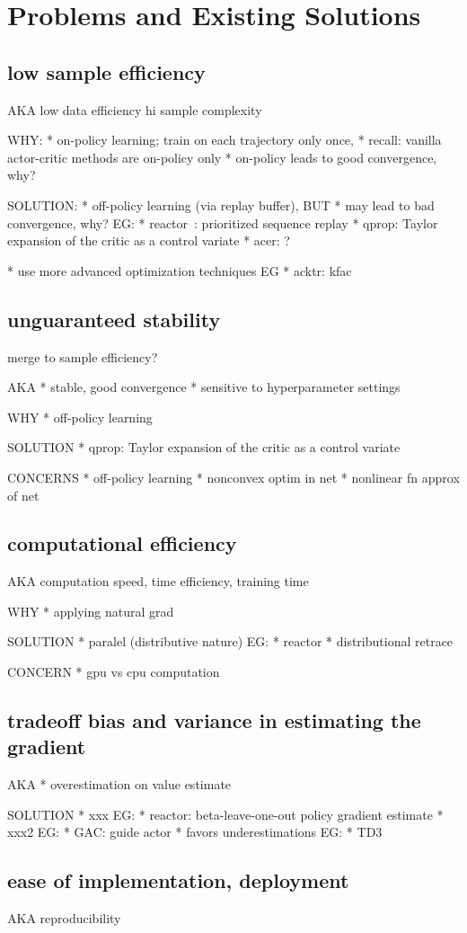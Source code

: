 \section{Problems and Existing Solutions}

\subsection{low sample efficiency}
AKA
low data efficiency
hi sample complexity

WHY:
* on-policy learning; train on each trajectory only once,
  * recall: vanilla actor-critic methods are on-policy only
  * on-policy leads to good convergence, why?

SOLUTION:
* off-policy learning (via replay buffer),
  BUT
  * may lead to bad convergence, why?
  EG:
  * reactor~\cite{Gruslys2018}: prioritized sequence replay
  * qprop:  Taylor expansion of the critic as a control variate
  * acer: ?

* use more advanced optimization techniques
EG
* acktr: kfac

\subsection{unguaranteed stability}
merge to sample efficiency?

AKA
* stable, good convergence
* sensitive to hyperparameter settings

WHY
* off-policy learning

SOLUTION
* qprop: Taylor expansion of the critic as a control variate

CONCERNS
* off-policy learning
* nonconvex optim in net
* nonlinear fn approx of net

\subsection{computational efficiency}
AKA
computation speed,
time efficiency,
training time

WHY
* applying natural grad

SOLUTION
* paralel (distributive nature)
  EG:
  * reactor
    * distributional retrace

CONCERN
* gpu vs cpu computation

\subsection{tradeoff bias and variance in estimating the gradient}
AKA
* overestimation on value estimate

SOLUTION
* xxx
  EG:
  * reactor: beta-leave-one-out policy gradient estimate
* xxx2
  EG:
  * GAC: guide actor
* favors underestimations
  EG:
  * TD3

\subsection{ease of implementation, deployment}
AKA
reproducibility

